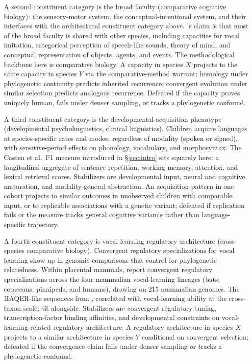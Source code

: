 \documentclass[12pt]{article}
\begin{document}
A second constituent category is the broad faculty (comparative cognitive biology): the sensory-motor system, the conceptual-intentional system, and their interfaces with the architectural constituent category above. \citeauthor{hauser2002}'s claim is that most of the broad faculty is shared with other species, including capacities for vocal imitation, categorical perception of speech-like sounds, theory of mind, and conceptual representation of objects, agents, and events. The methodological backbone here is comparative biology. A capacity in species $X$ projects to the same capacity in species $Y$ via the comparative-method warrant: homology under phylogenetic continuity predicts inherited recurrence; convergent evolution under similar selection predicts analogous recurrence. Defeated if the capacity proves uniquely human, fails under denser sampling, or tracks a phylogenetic confound.

A third constituent category is the developmental-acquisition phenotype (developmental psycholinguistics, clinical linguistics). Children acquire languages at species-specific rates and modes, regardless of modality (spoken or signed), with sensitive-period effects on phonology, vocabulary, and morphosyntax. The Casten et al.\ F1 measure introduced in §\ref{sec:intro} sits squarely here: a longitudinal aggregate of sentence repetition, working memory, attention, and lexical retrieval scores. Stabilizers are developmental input, neural and cognitive maturation, and modality-general abstraction. An acquisition pattern in one cohort projects to similar outcomes in unobserved children with comparable input, or to replicable associations with a genetic variant; defeated if replication fails or the measure tracks general cognitive variance rather than language-specific trajectory.

A fourth constituent category is vocal-learning regulatory architecture (cross-species comparative biology). Convergent regulatory specializations for vocal learning show up in genomic comparisons that control for phylogenetic relatedness. Within placental mammals, \textcite{wirthlin2024} report convergent regulatory specializations across the four mammalian vocal-learning lineages (bats, cetaceans, pinnipeds, and humans), drawing on 215 mammalian genomes. The HAQER-like sequences from \textcite{casten2026}, correlated with vocal-learning ability at the cross-taxon scale, sit alongside. Stabilizers are convergent regulatory tuning, transcription-factor binding affinities, and developmental constraints on vocal-learning-related regulatory architecture. A regulatory architecture in species $X$ projects to a similar architecture in species $Y$ conditional on convergent selection; defeated if the convergence claim fails under denser sampling or tracks a phylogenetic confound.
\end{document}
